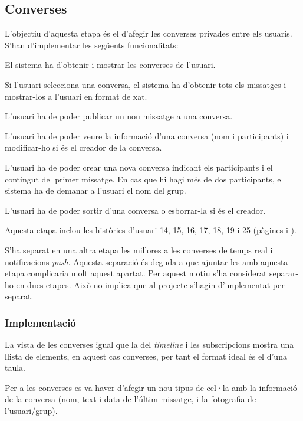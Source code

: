 \subsection{Converses}
\label{sec:fase4}

L'objectiu d'aquesta etapa és el d'afegir les converses privades entre els usuaris. S'han d'implementar les següents funcionalitats:

\begin{compactitem}
    \item El sistema ha d'obtenir i mostrar les converses de l'usuari.
    \item Si l'usuari selecciona una conversa, el sistema ha d'obtenir tots els missatges i mostrar-los a l'usuari en format de xat.
    \item L'usuari ha de poder publicar un nou missatge a una conversa.
    \item L'usuari ha de poder veure la informació d'una conversa (nom i participants) i modificar-ho si és el creador de la conversa.
    \item L'usuari ha de poder crear una nova conversa indicant els participants i el contingut del primer missatge. En cas que hi hagi més de dos participants, el sistema ha de demanar a l'usuari el nom del grup.
    \item L'usuari ha de poder sortir d'una conversa o esborrar-la si és el creador.
\end{compactitem}

Aquesta etapa inclou les històries d'usuari 14, 15, 16, 17, 18, 19 i 25 (pàgines \pageref{sec:historia_14} i \pageref{sec:historia_25}).

S'ha separat en una altra etapa les millores a les converses de temps real i notificacions \textit{push}. Aquesta separació és deguda a que ajuntar-les amb aquesta etapa complicaria molt aquest apartat. Per aquest motiu s'ha considerat separar-ho en dues etapes. Això no implica que al projecte s'hagin d'implementat per separat.

\subsubsection{Implementació}

La vista de les converses igual que la del \textit{timeline} i les subscripcions mostra una llista de elements, en aquest cas converses, per tant el format ideal és el d'una taula.

Per a les converses es va haver d'afegir un nou tipus de cel·la amb la informació de la conversa (nom, text i data de l'últim missatge, i la fotografia de l'usuari/grup).

